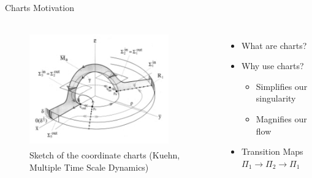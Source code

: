 \documentclass[11pt]{beamer}
\begin{document}
\begin{frame}{Charts Motivation}
    \begin{columns}
    \begin{figure}
        \centering
        \includegraphics[height=5cm,width=6cm]{Charts.png}
        \caption{Sketch of the coordinate charts (Kuehn, Multiple Time Scale Dynamics)}
    \end{figure}    
        \begin{itemize}
            \item What are charts?
            \item Why use charts?
            \begin{itemize}
                \item Simplifies our singularity
                \item Magnifies our flow 
            \end{itemize}
            \item Transition Maps $\Pi_1\to \Pi_2\to \Pi_1$
        \end{itemize}

    \end{columns}
\end{frame}
\end{document}
